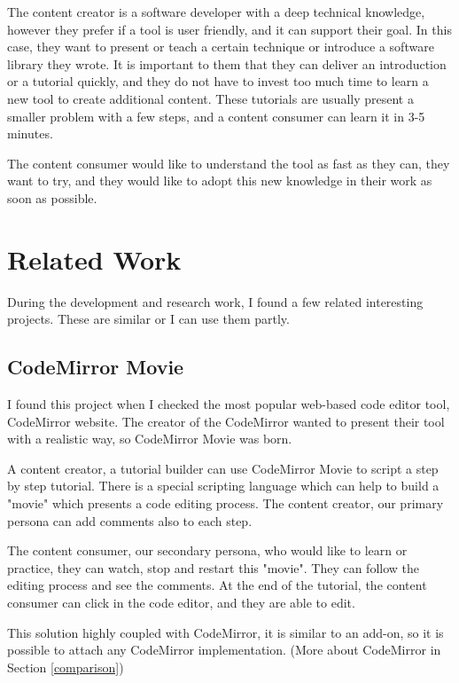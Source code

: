 \documentclass[11pt, a4paper, oneside, openright, medskipamount]{report}
\begin{document}
The content creator is a software developer with a deep technical knowledge, however they prefer if a tool is user friendly, and it can support their goal. In this case, they want to present or teach a certain technique or introduce a software library they wrote. It is important to them that they can deliver an introduction or a tutorial quickly, and they do not have to invest too much time to learn a new tool to create additional content. These tutorials are usually present a smaller problem with a few steps, and a content consumer can learn it in 3-5 minutes.

The content consumer would like to understand the tool as fast as they can, they want to try, and they would like to adopt this new knowledge in their work as soon as possible.

\chapter{Related Work}

During the development and research work, I found a few related interesting projects. These are similar or I can use them partly.

\section{CodeMirror Movie}

I found this project when I checked the most popular web-based code editor tool, CodeMirror website. The creator of the CodeMirror wanted to present their tool with a realistic way, so CodeMirror Movie was born. \cite{cm-movie}

A content creator, a tutorial builder can use CodeMirror Movie to script a step by step tutorial. There is a special scripting language which can help to build a "movie" which presents a code editing process. The content creator, our primary persona can add comments also to each step.

The content consumer, our secondary persona, who would like to learn or practice, they can watch, stop and restart this "movie". They can follow the editing process and see the comments. At the end of the tutorial, the content consumer can click in the code editor, and they are able to edit.

This solution highly coupled with CodeMirror, it is similar to an add-on, so it is possible to attach any CodeMirror implementation. (More about CodeMirror in Section \ref{comparison})
\end{document}
